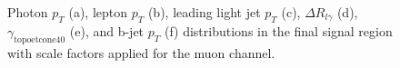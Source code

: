\begin{figure}[]
\hfil  %
\caption{Photon $p_T$ (a), lepton $p_T$ (b), leading light jet $p_T$ (c), $\Delta R_{l\gamma}$ (d), $\gamma_\text{topoetcone40}$ (e), and b-jet $p_T$ (f) distributions in the final signal region with scale factors applied for the muon channel.}
\label{fig:SRmuj1}
\end{figure}


